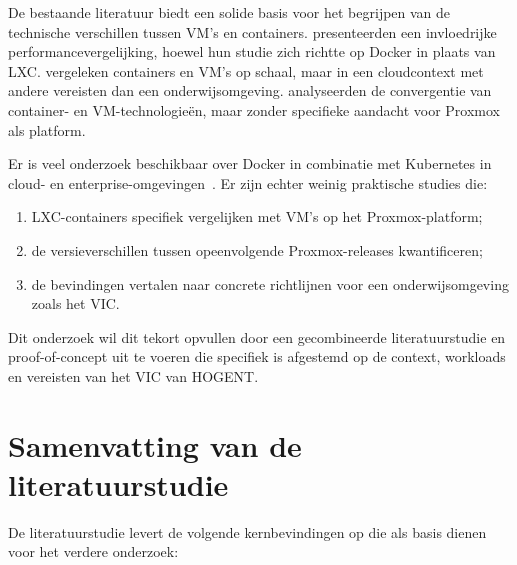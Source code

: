 De bestaande literatuur biedt een solide basis voor het begrijpen van de technische verschillen tussen VM's en containers. \textcite{Felter2015} presenteerden een invloedrijke performancevergelijking, hoewel hun studie zich richtte op Docker in plaats van LXC. \textcite{Sharma2016} vergeleken containers en VM's op schaal, maar in een cloudcontext met andere vereisten dan een onderwijsomgeving. \textcite{ArXiv2023Convergence} analyseerden de convergentie van container- en VM-technologieën, maar zonder specifieke aandacht voor Proxmox als platform.

Er is veel onderzoek beschikbaar over Docker in combinatie met Kubernetes in cloud- en enterprise-omgevingen~\autocite{ArXiv2018DevOps, IEEE2018}. Er zijn echter weinig praktische studies die:

\begin{enumerate}
    \item LXC-containers specifiek vergelijken met VM's op het Proxmox-platform;
    \item de versieverschillen tussen opeenvolgende Proxmox-releases kwantificeren;
    \item de bevindingen vertalen naar concrete richtlijnen voor een onderwijsomgeving zoals het VIC.
\end{enumerate}

Dit onderzoek wil dit tekort opvullen door een gecombineerde literatuurstudie en proof-of-concept uit te voeren die specifiek is afgestemd op de context, workloads en vereisten van het VIC van HOGENT.

\section{Samenvatting van de literatuurstudie}
\label{sec:samenvatting-literatuurstudie}

De literatuurstudie levert de volgende kernbevindingen op die als basis dienen voor het verdere onderzoek:

